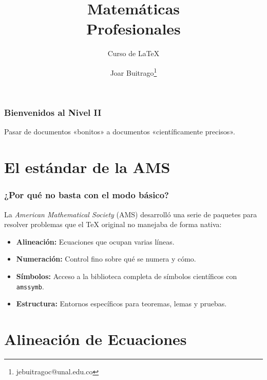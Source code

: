 \documentclass[12pt,aspectratio=169,ignorenonframetext]{ltxbeamer}
\title{Matemáticas\\Profesionales}
\subtitle{Curso de {\lmr\LaTeX}}
\author{Joar Buitrago\texorpdfstring{\thanks{jebuitragoc@unal.edu.co}}{ <jebuitragoc@unal.edu.co>}}
\date{}
\begin{document}
\begin{frame}
\titlepage
\end{frame}



\begin{frame}
    \frametitle{Bienvenidos al Nivel II}

    \centering
    {\fontsize{36}{38}\selectfont Pasar de documentos «bonitos» a documentos «científicamente precisos».\par}
\end{frame}



\section{El estándar de la AMS}
\begin{frame}
    \frametitle{¿Por qué no basta con el modo básico?}
    La \textit{American Mathematical Society} (AMS) desarrolló una serie de paquetes para resolver problemas que el {\lmr\TeX} original no manejaba de forma nativa:
    \vspace{1em}\pause
    \begin{itemize}
        \item<+-> \textbf{Alineación:} Ecuaciones que ocupan varias líneas.
        \item<+-> \textbf{Numeración:} Control fino sobre qué se numera y cómo.
        \item<+-> \textbf{Símbolos:} Acceso a la biblioteca completa de símbolos científicos con \texttt{amssymb}.
        \item<+-> \textbf{Estructura:} Entornos específicos para teoremas, lemas y pruebas.
    \end{itemize}
\end{frame}



\section{Alineación de Ecuaciones}
\end{document}
